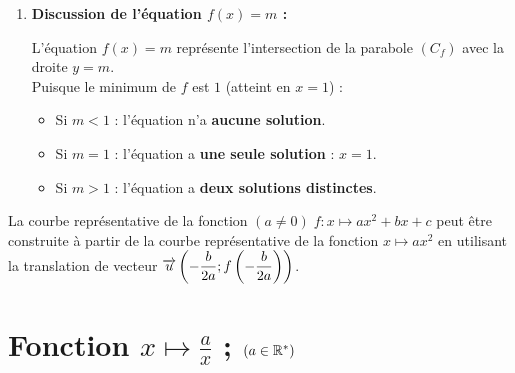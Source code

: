 \documentclass[10pt, a4paper]{article}
\begin{document}
\begin{Solution}[APPLICATION][22]
\begin{enumerate}[leftmargin=*,itemsep=0.5pt]
\begin{center}
\end{center}

    \item \textbf{Discussion de l'équation $f(x) = m$ :}

    L'équation $f(x) = m$ représente l'intersection de la parabole $(C_f)$ avec la droite $y = m$. \\
    Puisque le minimum de $f$ est $1$ (atteint en $x = 1$) :
    \begin{itemize}[leftmargin=*,itemsep=0.5pt]
        \item Si $m < 1$ : l'équation n'a \textbf{aucune solution}.
        \item Si $m = 1$ : l'équation a \textbf{une seule solution} : $x = 1$.
        \item Si $m > 1$ : l'équation a \textbf{deux solutions distinctes}.
    \end{itemize}
\end{enumerate}
\end{Solution}


\begin{Remarque}
La courbe représentative de la fonction $(a \neq 0) \; f : x \mapsto ax^2 + bx + c$ peut être construite à partir de la courbe représentative de la fonction $x \mapsto ax^2$ en utilisant la translation de vecteur $\overrightarrow{u} \left( -\dfrac{b}{2a} ; f\left(-\dfrac{b}{2a}\right) \right)$.
\end{Remarque}


\section{Fonction $x \mapsto \frac{a}{x}$ ; $(a \in \mathbb{R}^*)$ }
\end{document}
